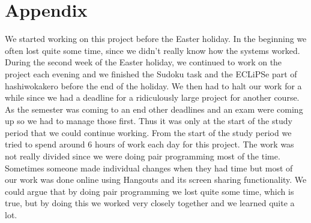 \documentclass{report}
\newcommand{\mychapter}[2]{
    \setcounter{chapter}{#1}
    \setcounter{section}{0}
    \chapter*{#2}
    \addcontentsline{toc}{chapter}{#2}
}
\begin{document}
\mychapter{4}{Appendix}
We started working on this project before the Easter holiday. In the beginning we often lost quite some time, since we didn't really know how the systems worked. During the second week of the Easter holiday, we continued to work on the project each evening and we finished the Sudoku task and the ECLiPSe part of hashiwokakero before the end of the holiday. We then had to halt our work for a while since we had a deadline for a ridiculously large project for another course. As the semester was coming to an end other deadlines and an exam were coming up so we had to manage those first. Thus it was only at the start of the study period that we could continue working. From the start of the study period we tried to spend around 6 hours of work each day for this project. The work was not really divided since we were doing pair programming most of the time. Sometimes someone made individual changes when they had time but most of our work was done online using Hangouts and its screen sharing functionality. We could argue that by doing pair programming we lost quite some time, which is true, but by doing this we worked very closely together and we learned quite a lot.
\end{document}
